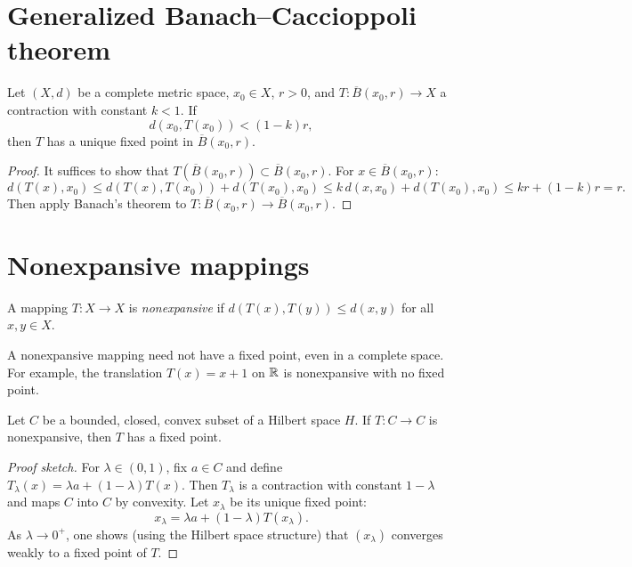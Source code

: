 \section{Generalized Banach--Caccioppoli theorem}

\begin{theorem}
Let $(X, d)$ be a complete metric space, $x_0 \in X$, $r > 0$, and
$T : \overline{B}(x_0, r) \to X$ a contraction with constant $k < 1$. If
\[
    d(x_0, T(x_0)) < (1 - k) r,
\]
then $T$ has a unique fixed point in $\overline{B}(x_0, r)$.
\end{theorem}

\begin{proof}
It suffices to show that $T(\overline{B}(x_0, r)) \subset \overline{B}(x_0, r)$.
For $x \in \overline{B}(x_0, r)$:
\[
    d(T(x), x_0) \leq d(T(x), T(x_0)) + d(T(x_0), x_0)
    \leq k \, d(x, x_0) + d(T(x_0), x_0) \leq kr + (1-k)r = r.
\]
Then apply Banach's theorem to $T : \overline{B}(x_0, r) \to \overline{B}(x_0, r)$.
\end{proof}

\section{Nonexpansive mappings}

\begin{definition}
A mapping $T : X \to X$ is \emph{nonexpansive} if $d(T(x), T(y)) \leq d(x, y)$
for all $x, y \in X$.
\end{definition}

\begin{remark}
A nonexpansive mapping need not have a fixed point, even in a complete space.
For example, the translation $T(x) = x + 1$ on $\mathbb{R}$ is nonexpansive with no
fixed point.
\end{remark}

\begin{theorem}
Let $C$ be a bounded, closed, convex subset of a Hilbert space $H$. If
$T : C \to C$ is nonexpansive, then $T$ has a fixed point.
\end{theorem}

\begin{proof}[Proof sketch]
For $\lambda \in (0,1)$, fix $a \in C$ and define
$T_\lambda(x) = \lambda a + (1-\lambda) T(x)$. Then $T_\lambda$ is a contraction
with constant $1 - \lambda$ and maps $C$ into $C$ by convexity. Let $x_\lambda$
be its unique fixed point:
\[
    x_\lambda = \lambda a + (1-\lambda) T(x_\lambda).
\]
As $\lambda \to 0^+$, one shows (using the Hilbert space structure) that
$(x_\lambda)$ converges weakly to a fixed point of $T$.
\end{proof}

